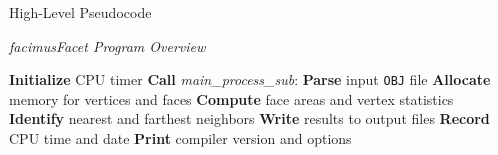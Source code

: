 \begin{frame}[fragile]{High-Level Pseudocode}
\begin{algorithm}[H]
    \caption{\textit{facimusFacet Program Overview}}
    \begin{algorithmic}[1]
        \State \textbf{Initialize} CPU timer
        \State \textbf{Call} \textit{main\_process\_sub}:
        \Statex \hspace{2em} \textbf{Parse} input \texttt{OBJ} file
        \Statex \hspace{2em} \textbf{Allocate} memory for vertices and faces
        \Statex \hspace{2em} \textbf{Compute} face areas and vertex statistics
        \Statex \hspace{2em} \textbf{Identify} nearest and farthest neighbors
        \Statex \hspace{2em} \textbf{Write} results to output files
        \State \textbf{Record} CPU time and date
        \State \textbf{Print} compiler version and options
    \end{algorithmic}
\end{algorithm}
\end{frame}


